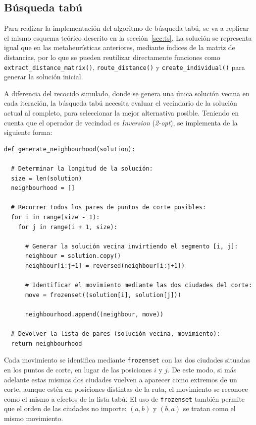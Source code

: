 \subsection{Búsqueda tabú}
\label{subsec:ts_imp}

Para realizar la implementación del algoritmo de búsqueda tabú, se va a replicar el mismo esquema teórico descrito en la 
sección~\ref{sec:ts}. La solución se representa igual que en las metaheurísticas anteriores, mediante índices de la matriz
de distancias, por lo que se pueden reutilizar directamente funciones como \texttt{extract\_distance\_matrix()}, 
\texttt{route\_distance()} y \texttt{create\_individual()} para generar la solución inicial.

A diferencia del recocido simulado, donde se genera una única solución vecina en cada iteración, la búsqueda tabú 
necesita evaluar el vecindario de la solución actual al completo, para seleccionar la mejor alternativa posible. Teniendo
en cuenta que el operador de vecindad es \textit{Inversion} (\textit{2-opt}), se implementa de la siguiente forma:
\newline
\begin{lstlisting}[style=PythonStyle]
def generate_neighbourhood(solution):

  # Determinar la longitud de la solución:
  size = len(solution)
  neighbourhood = []

  # Recorrer todos los pares de puntos de corte posibles:
  for i in range(size - 1):
    for j in range(i + 1, size):

      # Generar la solución vecina invirtiendo el segmento [i, j]:
      neighbour = solution.copy()
      neighbour[i:j+1] = reversed(neighbour[i:j+1])

      # Identificar el movimiento mediante las dos ciudades del corte:
      move = frozenset((solution[i], solution[j]))

      neighbourhood.append((neighbour, move))

  # Devolver la lista de pares (solución vecina, movimiento):
  return neighbourhood
\end{lstlisting}

Cada movimiento se identifica mediante \texttt{frozenset} con las dos ciudades situadas en los puntos de corte, en lugar
de las posiciones $i$ y $j$. De este modo, si más adelante estas mismas dos ciudades vuelven a aparecer como extremos de 
un corte, aunque estén en posiciones distintas de la ruta, el movimiento se reconoce como el mismo a efectos de la lista 
tabú. El uso de \texttt{frozenset} también permite que el orden de las ciudades no importe: $(a, b)$ y $(b, a)$ se tratan 
como el mismo movimiento.

